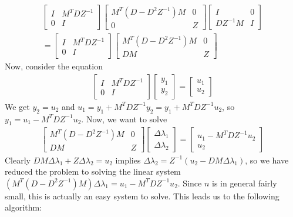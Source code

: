 \documentclass{article}
\begin{document}
\begin{align}
		\begin{bmatrix}
				I & M^T DZ^{-1}\\
				0 & I
		\end{bmatrix}
		\begin{bmatrix}
				M^T(D - D^2Z^{-1})M & 0\\
				0 & Z
		\end{bmatrix}
		\begin{bmatrix}
				I & 0\\
				DZ^{-1} M & I
		\end{bmatrix}\\
		= 
		\begin{bmatrix}
				I & M^T DZ^{-1}\\
				0 & I
		\end{bmatrix}
		\begin{bmatrix}
			M^T(D-D^2Z^{-1})M & 0\\
			DM & Z
		\end{bmatrix}
\end{align}
Now, consider the equation
\begin{align}
		\begin{bmatrix}
				I & M^T DZ^{-1}\\
				0 & I
		\end{bmatrix}
		\begin{bmatrix}
			y_1\\
			y_2
		\end{bmatrix}
		=
		\begin{bmatrix}
			u_1\\
			u_2
		\end{bmatrix}
\end{align}
We get $y_2 = u_2$ and $u_1 = y_1 + M^TDZ^{-1} y_2 = y_1 + M^TDZ^{-1} u_2$, so $y_1 = u_1 - M^TDZ^{-1}u_2$. Now, we want to solve
\begin{align}
		\begin{bmatrix}
			M^T(D-D^2Z^{-1})M & 0\\
			DM & Z
		\end{bmatrix}
		\begin{bmatrix}
			\Delta \lambda_1\\
			\Delta \lambda_2
		\end{bmatrix}
		=
		\begin{bmatrix}
			u_1 - M^TDZ^{-1}u_2\\
			u_2
		\end{bmatrix}
\end{align}
Clearly $DM \Delta \lambda_1 + Z\Delta \lambda_2 = u_2$ implies $\Delta \lambda_2 = Z^{-1}(u_2 - DM\Delta\lambda_1)$, so we have reduced the problem to solving the linear system $(M^T(D-D^2Z^{-1})M)\Delta \lambda_1 = u_1 - M^TDZ^{-1}u_2$. Since $n$ is in general fairly small, this is actually an easy system to solve. This leads us to the following algorithm:
\end{document}
